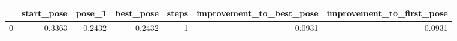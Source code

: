 \begin{tabular}{lrrrrrr}
\toprule
{} &  start\_pose &  pose\_1 &  best\_pose &  steps &  improvement\_to\_best\_pose &  improvement\_to\_first\_pose \\
\midrule
0 &      0.3363 &  0.2432 &     0.2432 &      1 &                   -0.0931 &                    -0.0931 \\
\bottomrule
\end{tabular}
